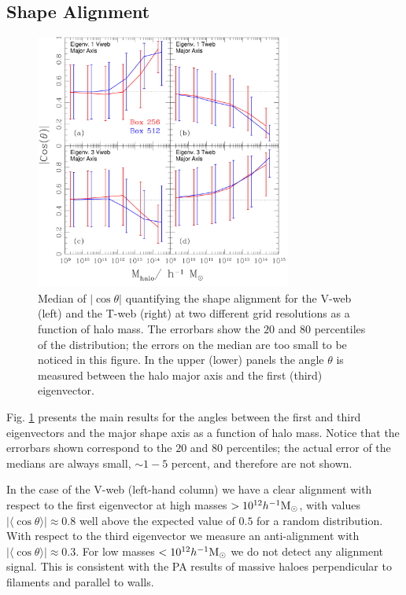 \documentclass[useAMS,usenatbib]{mn2e}
\newcommand{\hMsun}{{\ifmmode{h^{-1}{\rm
        {M_{\odot}}}}\else{$h^{-1}{\rm{M_{\odot}}}$~}\fi}}
\newcommand{\muavg}{\vert\langle\cos\theta\rangle\vert}
\begin{document}
\subsection{Shape Alignment}

\begin{figure}
\includegraphics[width=0.75\textwidth]{Fig2.pdf}
\caption{Median of $|\cos\theta|$ quantifying the shape alignment for
  the V-web (left) and the T-web (right) at two different grid
  resolutions as a function of halo mass.  The errorbars show the $20$ and $80$ percentiles 
  of the distribution; the
  errors on the median are too small to be noticed in this figure. In the upper (lower) panels
  the angle $\theta$ is measured between the halo major axis and the first (third)
  eigenvector.\label{fig:shape_alignment} }
\end{figure}


Fig. \ref{fig:shape_alignment} presents the main results for the
angles between the first and third eigenvectors and the major shape
axis as a function of halo mass.  Notice that the errorbars shown correspond
to the $20$ and $80$ percentiles; the actual error of the medians are
always small, $\sim 1-5$ percent, and therefore are not shown.  

In the case of the V-web (left-hand column) we have a clear alignment with
respect to the first eigenvector at high masses $>10^{12}\hMsun$, with
values $\muavg\approx 0.8$ well above the expected value of $0.5$ for a
random distribution. With respect to the third eigenvector we measure
an anti-alignment with $\muavg\approx0.3$. For low masses
$<10^{12}\hMsun$ we do not detect any alignment signal. This is
consistent with the PA results of massive haloes
perpendicular to filaments and parallel to walls.
\end{document}
